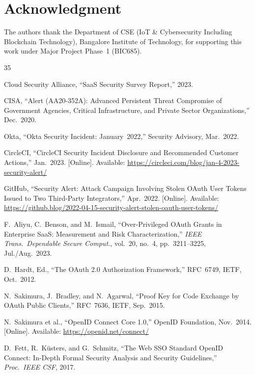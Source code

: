 \documentclass[conference]{IEEEtran}
\begin{document}
\section*{Acknowledgment}

The authors thank the Department of CSE (IoT \& Cybersecurity
Including Blockchain Technology), Bangalore Institute of Technology,
for supporting this work under Major Project Phase~1 (BIC685).

\begin{thebibliography}{35}

Cloud Security Alliance, ``SaaS Security Survey Report,'' 2023.

CISA, ``Alert (AA20-352A): Advanced Persistent Threat Compromise of
Government Agencies, Critical Infrastructure, and Private Sector
Organizations,'' Dec.~2020.

Okta, ``Okta Security Incident: January~2022,'' Security Advisory,
Mar.~2022.

CircleCI, ``CircleCI Security Incident Disclosure and Recommended
Customer Actions,'' Jan.~2023. [Online]. Available:
\url{https://circleci.com/blog/jan-4-2023-security-alert/}

GitHub, ``Security Alert: Attack Campaign Involving Stolen OAuth
User Tokens Issued to Two Third-Party Integrators,'' Apr.~2022.
[Online]. Available:
\url{https://github.blog/2022-04-15-security-alert-stolen-oauth-user-tokens/}

F.~Aliyu, C.~Benson, and M.~Ismail, ``Over-Privileged OAuth Grants
in Enterprise SaaS: Measurement and Risk Characterization,''
\textit{IEEE Trans.\ Dependable Secure Comput.}, vol.~20, no.~4,
pp.~3211--3225, Jul./Aug.~2023.

D.~Hardt, Ed., ``The OAuth 2.0 Authorization Framework,'' RFC~6749,
IETF, Oct.~2012.

N.~Sakimura, J.~Bradley, and N.~Agarwal, ``Proof Key for Code
Exchange by OAuth Public Clients,'' RFC~7636, IETF, Sep.~2015.

N.~Sakimura et al., ``OpenID Connect Core 1.0,'' OpenID Foundation,
Nov.~2014. [Online]. Available: \url{https://openid.net/connect/}

D.~Fett, R.~K\"{u}sters, and G.~Schmitz, ``The Web SSO Standard
OpenID Connect: In-Depth Formal Security Analysis and Security
Guidelines,'' \textit{Proc.\ IEEE CSF}, 2017.


\end{thebibliography}
\end{document}
